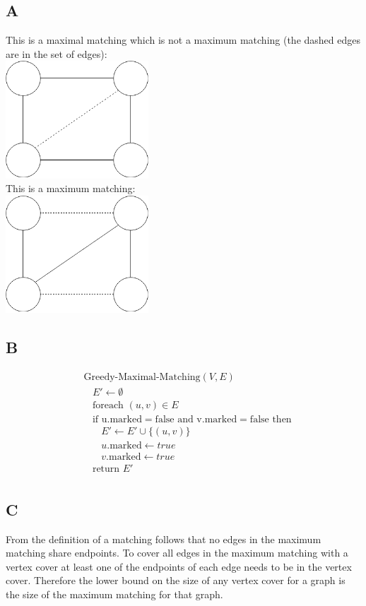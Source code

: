 \documentclass[koma,a4paper]{article}
\begin{document}
\subsection{A}
This is a maximal matching which is not a maximum matching (the dashed edges are in the set of edges):\\
\includegraphics[width=0.4\textwidth]{graph1}\\
This is a maximum matching:\\
\includegraphics[width=0.4\textwidth]{graph2}\\
\subsection{B}
\begin{align*}
  &\text{Greedy-Maximal-Matching}(V,E)\\
  &~~~~E' \leftarrow \emptyset\\
  &~~~~\text{foreach } (u,v) \in E\\
  &~~~~\text{if u.marked} = \text{false and v.marked} = \text{false then}\\
  &~~~~~~~~E' \leftarrow E' \cup \{(u,v)\}\\
  &~~~~~~~~u.\text{marked} \leftarrow true\\
  &~~~~~~~~v.\text{marked} \leftarrow true\\
  &~~~~\text{return } E'\\
\end{align*}
\subsection{C}
From the definition of a matching follows that no edges in the maximum matching share endpoints. To cover all edges in the maximum matching with a vertex cover at least one of the endpoints of each edge needs to be in the vertex cover. Therefore the lower bound on the size of any vertex cover for a graph is the size of the maximum matching for that graph.
\end{document}

